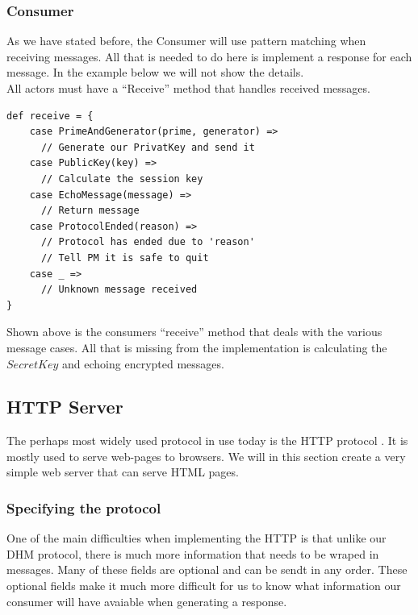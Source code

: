 \subsubsection{Consumer}
As we have stated before, the Consumer will use pattern matching when receiving messages. All that is needed to do here is implement a response for each message. In the example below we will not show the details. 
\\
All actors must have a ``Receive'' method that handles received messages. 
\begin{lstlisting}[style=myScalastyle]
def receive = {
    case PrimeAndGenerator(prime, generator) =>
      // Generate our PrivatKey and send it
    case PublicKey(key) =>
      // Calculate the session key
    case EchoMessage(message) =>
      // Return message
    case ProtocolEnded(reason) =>
      // Protocol has ended due to 'reason'
      // Tell PM it is safe to quit
    case _ =>
      // Unknown message received
}
\end{lstlisting}
Shown above is the consumers ``receive'' method that deals with the various message cases. All that is missing from the implementation is calculating the $SecretKey$ and echoing encrypted messages.

\subsection{HTTP Server}
\label{sec:httpserver}
The perhaps most widely used protocol in use today is the HTTP protocol \cite{fielding1999hypertext}. It is mostly used to serve web-pages to browsers. We will in this section create a very simple web server that can serve HTML pages.

\subsubsection{Specifying the protocol}
One of the main difficulties when implementing the HTTP is that unlike our DHM protocol, there is much more information that needs to be wraped in messages. Many of these fields are optional and can be sendt in any order. These optional fields make it much more difficult for us to know what information our consumer will have avaiable when generating a response.

